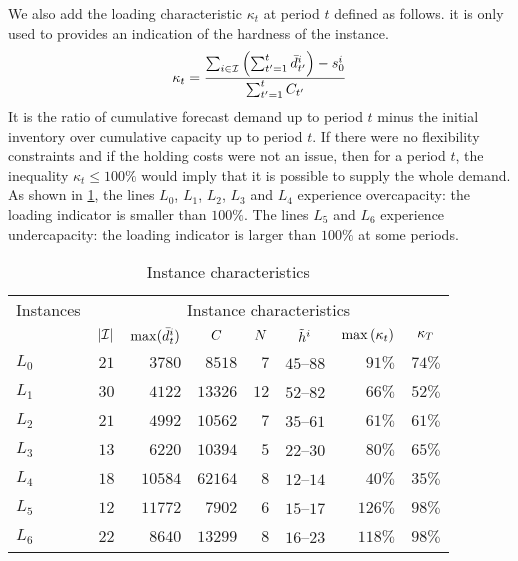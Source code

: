 We also add the loading characteristic $\kappa_t$ at period $t$ defined as follows. it is only used to provides an indication of the hardness of the instance.
\begin{equation}
  \kappa_t = \frac{\sum_{i\in\REF} \bracket{\sum_{t'=1}^{t} \bar{\demand}_{t'}^i}-\inventory_0^i}{ \sum_{t'=1}^{t} \capacity_{t'}}
\end{equation}
It is the ratio of cumulative forecast demand up to period $t$ minus the initial inventory over cumulative capacity up to period $t$.
If there were no flexibility constraints and if the holding costs were not an issue, then for a period $t$, the inequality $\kappa_t \le 100\%$ would imply that it is possible to supply the whole demand.
As shown in \cref{tab:pdp:instances-characterisitcs}, the lines $L_0$, $L_1$, $L_2$, $L_3$ and $L_4$ experience overcapacity: the loading indicator is smaller than $100\%$.
The lines $L_5$ and $L_6$ experience undercapacity: the loading indicator is larger than $100\%$ at some periods.


\begin{table}[ht]
\begin{center}
\begin{tabular*}{\linewidth}{@{\extracolsep{\fill}}lrrrrrrr@{\extracolsep{\fill}}}
\hline
Instances &
\multicolumn{7}{c}{Instance characteristics}
\\ \cline{2-8} \rule{0pt}{.9\normalbaselineskip}
& $\card{\REF}$
& $\max(\bar{d}_t^i)$
& \multicolumn{1}{c}{$C$}
& \multicolumn{1}{c}{$N$}
& \multicolumn{1}{c}{$\tilde{h}^i$}
& \multicolumn{1}{c}{$\max\bracket{\kappa_t}$}
& \multicolumn{1}{c}{$\kappa_{T}$}
\\\hline
$L_0$ & $21$ & $3780$ & $8518$ & $7$ & $45$--$88$ & $91\%$ & $74\%$
\\
$L_1$ & $30$ & $4122$ & $13326$ & $12$ & $52$--$82$ & $66\%$ & $52\%$
\\
$L_2$ & $21$ & $4992$ & $10562$ & $7$ & $35$--$61$ & $61\%$ & $61\%$
\\
$L_3$ & $13$ & $6220$ & $10394$ & $5$ & $22$--$30$ & $80\%$ & $65\%$
\\
$L_4$ & $18$ & $10584$ & $62164$ & $8$ & $12$--$14$ & $40\%$ & $35\%$
\\
$L_5$ & $12$ & $11772$ & $7902$ & $6$ & $15$--$17$ & $126\%$ & $98\%$
\\
$L_6$ & $22$ & $8640$ & $13299$ & $8$ & $16$--$23$ & $118\%$ & $98\%$
\\\hline
\end{tabular*}
\caption{Instance characteristics}
\label{tab:pdp:instances-characterisitcs}
\end{center}
\end{table}


